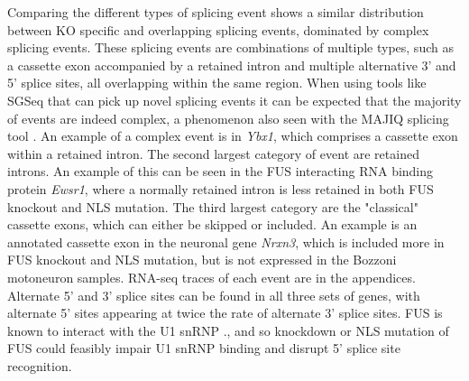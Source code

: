 Comparing the different types of splicing event shows a similar distribution between KO specific and overlapping splicing events, dominated by complex splicing events.
These splicing events are combinations of multiple types, such as a cassette exon accompanied by a retained intron and multiple alternative 3' and 5' splice sites, all overlapping within the same region. When using tools like SGSeq that can pick up novel splicing events it can be expected that the majority of events are indeed complex, a phenomenon also seen with the MAJIQ splicing tool \citep{Vaquero-Garcia2016}.
An example of a complex event is in \textit{Ybx1}, which comprises a cassette exon within a retained intron.
The second largest category of event are retained introns.
An example of this can be seen in the FUS interacting RNA binding protein \textit{Ewsr1}, where a normally retained intron is less retained in both FUS knockout and NLS mutation.
The third largest category are the "classical" cassette exons, which can either be skipped or included. 
An example is an annotated cassette exon in the neuronal gene \textit{Nrxn3}, which is included more in FUS knockout and NLS mutation, but is not expressed in the Bozzoni motoneuron samples.
RNA-seq traces of each event are in the appendices.
Alternate 5' and 3' splice sites can be found in all three sets of genes, with alternate 5' sites appearing at twice the rate of alternate 3' splice sites. FUS is known to interact with the U1 snRNP \citep{Yu2015a,Yu2015b}., and so knockdown or NLS mutation of FUS could feasibly impair U1 snRNP binding and disrupt 5' splice site recognition.


